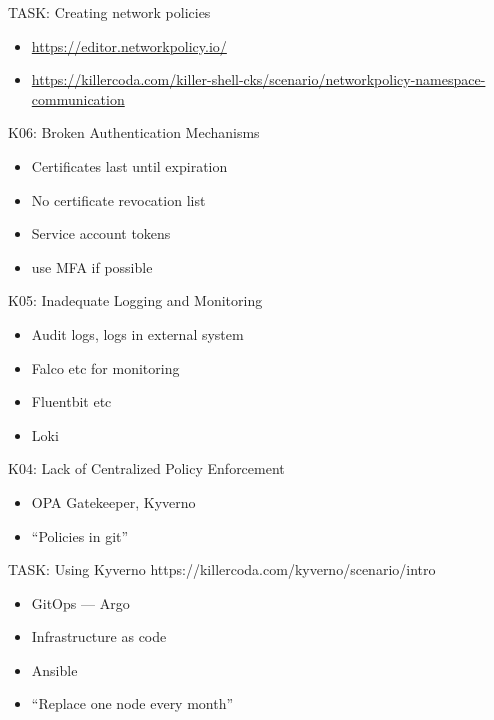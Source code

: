 \documentclass{dcpresentation}
\begin{document}
\begin{frame}{TASK: Creating network policies}
 \begin{itemize}
   \item \url{https://editor.networkpolicy.io/}
   \item \url{https://killercoda.com/killer-shell-cks/scenario/networkpolicy-namespace-communication}
 \end{itemize}
\end{frame}  
 


\begin{frame}{K06: Broken Authentication Mechanisms}
  \begin{itemize}
    \item Certificates last until expiration
      \item No certificate revocation list
    \item Service account tokens
    \item use MFA if possible
  \end{itemize}
\end{frame}


\begin{frame}{K05: Inadequate Logging and Monitoring}
  \begin{itemize}
  \item Audit logs, logs in external system
  \item Falco etc for monitoring
  \item Fluentbit etc
  \item Loki
  \end{itemize}
\end{frame}

\begin{frame}{K04: Lack of Centralized Policy Enforcement}
  \begin{itemize}
  \item OPA Gatekeeper, Kyverno
  \item ``Policies in git''
  \end{itemize}
\end{frame}

\begin{frame}{TASK: Using Kyverno}
 https://killercoda.com/kyverno/scenario/intro
\end{frame}

\begin{frame}
  \begin{itemize}
  \item GitOps --- Argo
  \item Infrastructure as code
  \item Ansible
  \item ``Replace one node every month''
  \end{itemize}
\end{frame}
\end{document}
